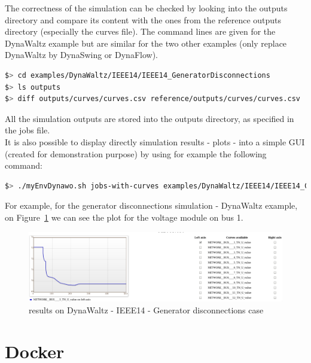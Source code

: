 \documentclass[a4paper, 12pt]{report}
\begin{document}
The correctness of the simulation can be checked by looking into the outputs directory and compare its content with the ones from the reference outputs directory (especially the curves file).
The command lines are given for the DynaWaltz example but are similar for the two other examples (only replace DynaWaltz by DynaSwing or DynaFlow).

\begin{lstlisting}[language=bash, breaklines=true, breakatwhitespace=false]
$> cd examples/DynaWaltz/IEEE14/IEEE14_GeneratorDisconnections
$> ls outputs
$> diff outputs/curves/curves.csv reference/outputs/curves/curves.csv
\end{lstlisting}

All the simulation outputs are stored into the outputs directory, as specified in the jobs file. \\

It is also possible to display directly simulation results - plots - into a simple GUI (created for demonstration purpose) by using for example the following command:

\begin{lstlisting}[language=bash, breaklines=true, breakatwhitespace=false]
$> ./myEnvDynawo.sh jobs-with-curves examples/DynaWaltz/IEEE14/IEEE14_GeneratorDisconnections/IEEE14.jobs
\end{lstlisting}

For example, for the generator disconnections simulation - DynaWaltz example, on Figure~\ref{IEEE14GeneratorDisconnections} we can see the plot for the voltage module on bus 1.

\begin{figure}[h!]
\centering
\includegraphics[width=\textwidth]{../resources/VoltageModule.png}
\caption{\Dynawo results on DynaWaltz - IEEE14 - Generator disconnections case}
\label{IEEE14GeneratorDisconnections}
\end{figure}

\section{\Dynawo Docker}
\label{sec:docker}
\end{document}
